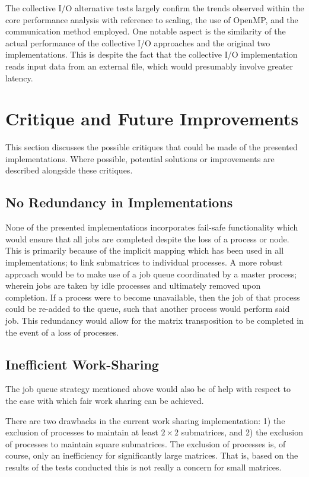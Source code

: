 \documentclass[journal,10pt,a4paper]{IEEEtran}
\begin{document}
The collective I/O alternative tests largely confirm the trends observed within the core performance analysis with reference to scaling, the use of OpenMP, and the communication method employed. One notable aspect is the similarity of the actual performance of the collective I/O approaches and the original two implementations. This is despite the fact that the collective I/O implementation reads input data from an external file, which would presumably involve greater latency.



\section{Critique and Future Improvements}
This section discusses the possible critiques that could be made of the presented implementations. Where possible, potential solutions or improvements are described alongside these critiques.

\subsection{No Redundancy in Implementations}

None of the presented implementations incorporates fail-safe functionality which would ensure that all jobs are completed despite the loss of a process or node. This is primarily because of the implicit mapping which has been used in all implementations; to link submatrices to individual processes. A more robust approach would be to make use of a job queue coordinated by a master process; wherein jobs are taken by idle processes and ultimately removed upon completion. If a process were to become unavailable, then the job of that process could be re-added to the queue, such that another process would perform said job. This redundancy would allow for the matrix transposition to be completed in the event of a loss of processes.

\subsection{Inefficient Work-Sharing}
The job queue strategy mentioned above would also be of help with respect to the ease with which fair work sharing can be achieved. 

There are two drawbacks in the current work sharing implementation: 1) the exclusion of processes to maintain at least $2\times2$ submatrices, and 2) the exclusion of processes to maintain square submatrices. The exclusion of processes is, of course, only an inefficiency for significantly large matrices. That is, based on the results of the tests conducted this is not really a concern for small matrices.
\end{document}
